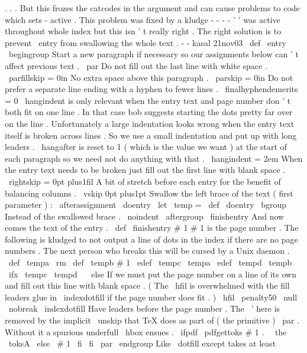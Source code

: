 {
.
.
.
%
But
this
frozes
the
catcodes
in
the
argument
and
can
cause
problems
to
%
code
which
sets
-
active
.
This
problem
was
fixed
by
a
kludge
-
-
-
%
-
'
'
was
active
throughout
whole
index
but
this
isn
'
t
really
right
.
%
%
The
right
solution
is
to
prevent
\
entry
from
swallowing
the
whole
text
.
%
-
-
kasal
21nov03
\
def
\
entry
{
%
\
begingroup
%
%
Start
a
new
paragraph
if
necessary
so
our
assignments
below
can
'
t
%
affect
previous
text
.
\
par
%
%
Do
not
fill
out
the
last
line
with
white
space
.
\
parfillskip
=
0in
%
%
No
extra
space
above
this
paragraph
.
\
parskip
=
0in
%
%
Do
not
prefer
a
separate
line
ending
with
a
hyphen
to
fewer
lines
.
\
finalhyphendemerits
=
0
%
%
\
hangindent
is
only
relevant
when
the
entry
text
and
page
number
%
don
'
t
both
fit
on
one
line
.
In
that
case
bob
suggests
starting
the
%
dots
pretty
far
over
on
the
line
.
Unfortunately
a
large
%
indentation
looks
wrong
when
the
entry
text
itself
is
broken
across
%
lines
.
So
we
use
a
small
indentation
and
put
up
with
long
leaders
.
%
%
\
hangafter
is
reset
to
1
(
which
is
the
value
we
want
)
at
the
start
%
of
each
paragraph
so
we
need
not
do
anything
with
that
.
\
hangindent
=
2em
%
%
When
the
entry
text
needs
to
be
broken
just
fill
out
the
first
line
%
with
blank
space
.
\
rightskip
=
0pt
plus1fil
%
%
A
bit
of
stretch
before
each
entry
for
the
benefit
of
balancing
%
columns
.
\
vskip
0pt
plus1pt
%
%
Swallow
the
left
brace
of
the
text
(
first
parameter
)
:
\
afterassignment
\
doentry
\
let
\
temp
=
}
\
def
\
doentry
{
%
\
bgroup
%
Instead
of
the
swallowed
brace
.
\
noindent
\
aftergroup
\
finishentry
%
And
now
comes
the
text
of
the
entry
.
}
\
def
\
finishentry
#
1
{
%
%
#
1
is
the
page
number
.
%
%
The
following
is
kludged
to
not
output
a
line
of
dots
in
the
index
if
%
there
are
no
page
numbers
.
The
next
person
who
breaks
this
will
be
%
cursed
by
a
Unix
daemon
.
\
def
\
tempa
{
{
\
rm
}
}
%
\
def
\
tempb
{
#
1
}
%
\
edef
\
tempc
{
\
tempa
}
%
\
edef
\
tempd
{
\
tempb
}
%
\
ifx
\
tempc
\
tempd
\
%
\
else
%
%
If
we
must
put
the
page
number
on
a
line
of
its
own
and
fill
out
%
this
line
with
blank
space
.
(
The
\
hfil
is
overwhelmed
with
the
%
fill
leaders
glue
in
\
indexdotfill
if
the
page
number
does
fit
.
)
\
hfil
\
penalty50
\
null
\
nobreak
\
indexdotfill
%
Have
leaders
before
the
page
number
.
%
%
The
\
'
here
is
removed
by
the
implicit
\
unskip
that
TeX
does
as
%
part
of
(
the
primitive
)
\
par
.
Without
it
a
spurious
underfull
%
\
hbox
ensues
.
\
ifpdf
\
pdfgettoks
#
1
.
%
\
\
the
\
toksA
\
else
\
#
1
%
\
fi
\
fi
\
par
\
endgroup
}
%
Like
\
dotfill
except
takes
at
least
}
